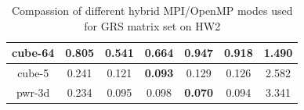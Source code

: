 \begin{table}[h!]
\begin{tabular}{|c|c|c|c|c|c|c|}
cube-64                                               & 0.805                                                     & \textbf{0.541}                                             & 0.664                                                     & 0.947                                                      & 0.918                                                      & 1.490                                                            \\ \hline
cube-5                                                & 0.241                                                     & 0.121                                                      & \textbf{0.093}                                            & 0.129                                                      & 0.126                                                      & 2.582                                                            \\ \hline
pwr-3d                                                & 0.234                                                     & 0.095                                                      & 0.098                                                     & \textbf{0.070}                                             & 0.094                                                      & 3.341                                                            \\ \hline
\end{tabular}
\caption{Compassion of different hybrid MPI/OpenMP modes used for GRS matrix set on HW2}
\label{fig:mpi-omp-grs-hw2}
\end{table}


